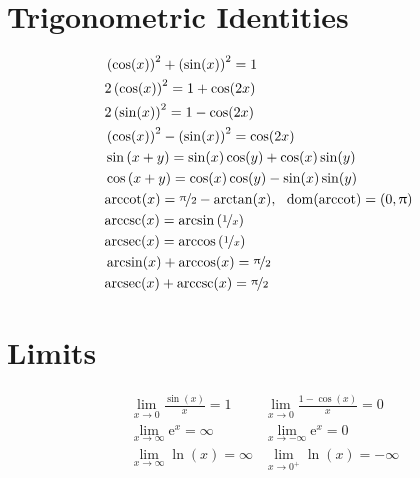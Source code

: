 \documentclass[letterpaper,9pt,fleqn]{extarticle}
\newcommand{\dom}{\mathrm{dom}}
\newcommand{\arcsec}{\mathrm{arcsec}}
\newcommand{\arccsc}{\mathrm{arccsc}}
\newcommand{\arccot}{\mathrm{arccot}}
\begin{document}
\begin{multicols*}{3}
\section*{Trigonometric Identities}
\vspace{-0.5in}
\begin{minipage}[c]{0.333\textwidth}
\begin{align*}
  &\left(\cos(x)\right)^2 + \left(\sin(x)\right)^2 = 1 \\
  &2 \left(\cos(x)\right)^2 =  1 + \cos(2 x) \\
  &2 \left(\sin(x)\right)^2 = 1 - \cos(2 x) \\
  & \left(\cos (x)\right)^2 - \left(\sin (x) \right)^2 = \cos(2x) \\
   &\sin\left(x +  y\right) =\sin (x) \cos (y) + \cos (x) \sin (y) \\
  &\cos\left(x+y\right)=\cos (x) \cos (y) - \sin (x) \sin (y)    \\
  &\arccot(x) = \nicefrac{\uppi}{2} - \arctan(x),  \,\,\,\, \dom(\arccot) = (0,\uppi)\\
  &\arccsc(x) = \arcsin \left (\nicefrac{1}{x} \right ) \\
  &\arcsec(x) = \arccos \left(\nicefrac{1}{x} \right) \\
  & \arcsin (x) + \arccos (x) = \nicefrac{\uppi}{2} \\
  & \arcsec (x) + \arccsc (x) = \nicefrac{\uppi}{2}
  \end{align*}
\end{minipage}
\begin{minipage}[c]{0.333\textwidth}
\section*{Limits}
\vspace{-0.4in}
\begin{align*}
 &\lim_{x \to 0}   \frac{\sin(x)}{x} = 1  & \lim_{x \to 0}   \frac{1-\cos(x)}{x} = 0 \\
 &\lim_{x \to \infty} \mathrm{e}^x = \infty & \lim_{x \to -\infty} \mathrm{e}^x = 0\\
  &\lim_{x \to \infty} \ln(x)  = \infty & \lim_{x \to 0^{+}} \ln(x)  = -\infty
 \end{align*}
\end{minipage}  
 \vspace{-0.2in}

\end{multicols*}
\end{document}
